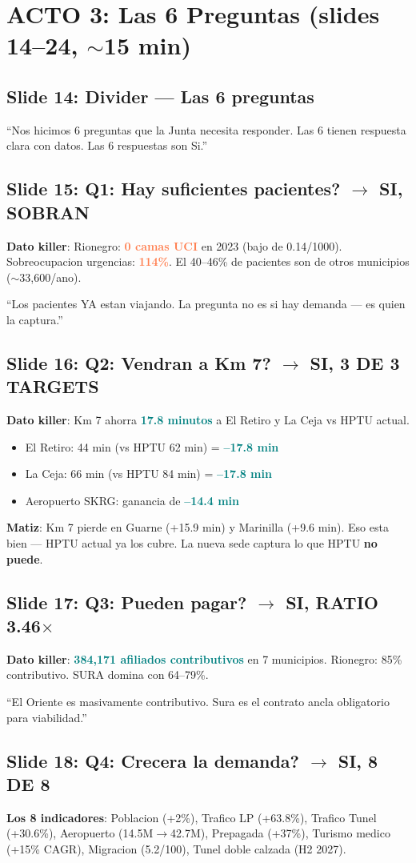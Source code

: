 \documentclass[10pt, a4paper]{article}
\newcommand{\hl}[1]{\textcolor{teal}{\textbf{#1}}}
\newcommand{\dg}[1]{\textcolor{coral}{\textbf{#1}}}
\newcommand{\slide}[2]{\subsection{Slide #1: #2}}
\begin{document}
\section{ACTO 3: Las 6 Preguntas (slides 14--24, $\sim$15 min)}

\slide{14}{Divider --- Las 6 preguntas}
\begin{tip}
``Nos hicimos 6 preguntas que la Junta necesita responder. Las 6 tienen respuesta clara con datos. Las 6 respuestas son Si.''
\end{tip}

\slide{15}{Q1: Hay suficientes pacientes? $\to$ SI, SOBRAN}
\textbf{Dato killer}: Rionegro: \dg{0 camas UCI} en 2023 (bajo de 0.14/1000). Sobreocupacion urgencias: \dg{114\%}. El 40--46\% de pacientes son de otros municipios ($\sim$33,600/ano).

\begin{cita}
``Los pacientes YA estan viajando. La pregunta no es si hay demanda --- es quien la captura.''
\end{cita}

\slide{16}{Q2: Vendran a Km 7? $\to$ SI, 3 DE 3 TARGETS}
\textbf{Dato killer}: Km 7 ahorra \hl{17.8 minutos} a El Retiro y La Ceja vs HPTU actual.
\begin{itemize}[nosep]
  \item El Retiro: 44 min (vs HPTU 62 min) = \hl{--17.8 min}
  \item La Ceja: 66 min (vs HPTU 84 min) = \hl{--17.8 min}
  \item Aeropuerto SKRG: ganancia de \hl{--14.4 min}
\end{itemize}
\textbf{Matiz}: Km 7 pierde en Guarne (+15.9 min) y Marinilla (+9.6 min). Eso esta bien --- HPTU actual ya los cubre. La nueva sede captura lo que HPTU \textbf{no puede}.

\slide{17}{Q3: Pueden pagar? $\to$ SI, RATIO 3.46$\times$}
\textbf{Dato killer}: \hl{384,171 afiliados contributivos} en 7 municipios. Rionegro: 85\% contributivo. SURA domina con 64--79\%.

\begin{cita}
``El Oriente es masivamente contributivo. Sura es el contrato ancla obligatorio para viabilidad.''
\end{cita}

\slide{18}{Q4: Crecera la demanda? $\to$ SI, 8 DE 8}
\textbf{Los 8 indicadores}: Poblacion (+2\%), Trafico LP (+63.8\%), Trafico Tunel (+30.6\%), Aeropuerto (14.5M$\to$42.7M), Prepagada (+37\%), Turismo medico (+15\% CAGR), Migracion (5.2/100), Tunel doble calzada (H2 2027).
\end{document}
